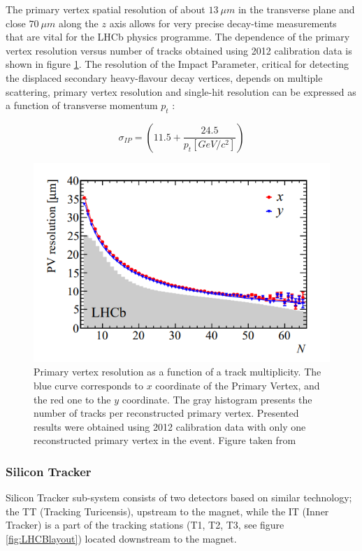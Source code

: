 The primary vertex spatial resolution of about $13~\mu m $ in the transverse plane and close $70~\mu m $ along the $z$ axis allows for very precise decay-time measurements that are vital for the LHCb physics programme. The dependence of the primary vertex resolution versus number of tracks obtained using 2012 calibration data is shown in figure \ref{fig:veloPerformance}. The resolution of the Impact Parameter, critical for detecting the displaced secondary 
heavy-flavour decay vertices, depends on  multiple scattering, primary vertex resolution and single-hit resolution can be expressed as a function of transverse momentum $p_t$ \cite{veloPerformance}: 

\begin{equation}
    \sigma_{IP} = \left( 11.5  + \frac{24.5}{p_t[GeV/c^2]} \right)
\end{equation}

\begin{figure}[h]
\centering
\includegraphics{figures/VeloResolution.PNG}
\caption{Primary vertex resolution as a function of a track multiplicity. The blue curve corresponds to $x$ coordinate of the Primary Vertex, and the red one to the $y$ coordinate. The gray histogram presents the number of tracks per reconstructed primary vertex. Presented results were obtained using 2012 calibration data with only one reconstructed primary vertex in the event. Figure taken from \cite{veloPerformance} 
\label{fig:veloPerformance}}
\end{figure}

\subsubsection{Silicon Tracker}
\label{sec:ST}
Silicon Tracker \cite{Silicon_Tracker} sub-system consists of two detectors based on similar technology; the TT (Tracking Turicensis), upstream to the magnet, while the IT (Inner Tracker) is a part of the tracking stations (T1, T2, T3, see figure \ref{fig:LHCBlayout}) located downstream to the magnet.

